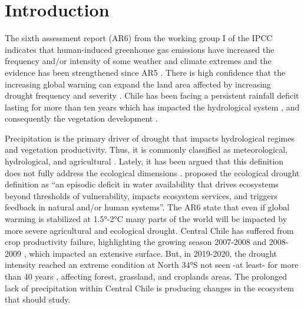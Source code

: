 \documentclass[preprint,
3p]{elsarticle} %
\begin{document}
\hypertarget{introduction}{%
\section{Introduction}\label{introduction}}

The sixth assessment report (AR6) from the working group I of the IPCC
\citep{IPCC2021} indicates that human-induced greenhouse gas emissions
have increased the frequency and/or intensity of some weather and
climate extremes and the evidence has been strengthened since AR5
\citep{IPCC2013}. There is high confidence that the increasing global
warning can expand the land area affected by increasing drought
frequency and severity \citep{IPCCCH112021}. Chile has been facing a
persistent rainfall deficit lasting for more than ten years
\citep{Garreaud2017} which has impacted the hydrological system
\citep{Boisier2018}, and consequently the vegetation development
\citep{Zambrano2020}.

Precipitation is the primary driver of drought that impacts hydrological
regimes and vegetation productivity. Thus, it is commonly classified as
meteorological, hydrological, and agricultural \citep{Wilhite1985}.
Lately, it has been argued that this definition does not fully address
the ecological dimensions \citep{Crausbay2017}. \citet{Crausbay2017}
proposed the ecological drought definition as ``an episodic deficit in
water availability that drives ecosystems beyond thresholds of
vulnerability, impacts ecosystem services, and triggers feedback in
natural and/or human systems''. The AR6 \citep{IPCC2021} state that even
if global warming is stabilized at 1.5°-2°C many parts of the world will
be impacted by more severe agricultural and ecological drought. Central
Chile has suffered from crop productivity failure, highlighting the
growing season 2007-2008 and 2008-2009
\citep{Zambrano2016, Zambrano2018}, which impacted an extensive surface.
But, in 2019-2020, the drought intensity reached an extreme condition at
North 34°S not seen -at least- for more than 40 years
\citep{Zambrano2020}, affecting forest, grassland, and croplands areas.
The prolonged lack of precipitation within Central Chile is producing
changes in the ecosystem that should study.
\end{document}
